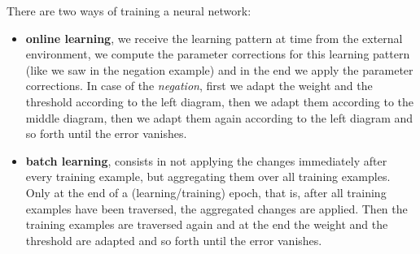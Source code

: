 \documentclass{article}
\begin{document}
There are two ways of training a neural network:
\begin{itemize}
    \item \textbf{online learning}, we receive the learning pattern at time from the
          external environment, we compute the parameter corrections for this learning pattern (like
          we saw in the negation example) and in the end we apply the parameter corrections. In
          case of the \textit{negation}, first we adapt the weight and the threshold according to the left diagram,
          then we adapt them according to the middle diagram, then we adapt them again
          according to the left diagram and so forth until the error vanishes.

    \item \textbf{batch learning}, consists in not applying the changes immediately after every
          training example, but aggregating them over all training examples. Only at the end of
          a (learning/training) epoch, that is, after all training examples have been traversed,
          the aggregated changes are applied. Then the training examples are traversed again
          and at the end the weight and the threshold are adapted and so forth until the error
          vanishes.
\end{itemize}
\end{document}
